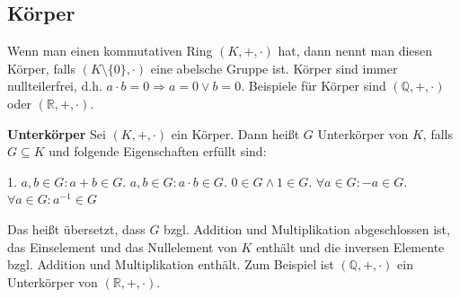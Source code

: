 \documentclass[12pt]{article}
\begin{document}
		\subsection{Körper}
			Wenn man einen kommutativen Ring $(K,+,\cdot)$ hat, dann nennt man diesen Körper, falls $(K\setminus\{0\},\cdot)$ eine abelsche Gruppe ist.\newline\newline
			Körper sind immer nullteilerfrei, d.h. $a\cdot b=0\Rightarrow a=0\lor b=0$.\newline\newline
			Beispiele für Körper sind $(\mathbb{Q},+,\cdot)$ oder $(\mathbb{R},+,\cdot)$.
			\begin{tcolorbox}[boxsep=0pt,top=0.75cm,left=.75cm,right=.5cm, bottom=.25cm,arc=0pt,auto outer arc,colback=white,colframe=black, enlarge top by=0.25cm]
				\textbf{Unterkörper}\vspace{.5em}\newline
				Sei $(K,+,\cdot)$ ein Körper. Dann heißt $G$ Unterkörper von $K$, falls $G\subseteq K$ und folgende Eigenschaften erfüllt sind:
				\begin{multicols}{2}
					1. $a,b\in G:a+b\in G$\newline{}. $a,b\in G:a\cdot b\in G$\newline{}. $0\in G\land 1\in G$\newline{}. $\forall a\in G:-a\in G$\newline{}. $\forall a\in G:a^{-1}\in G$\newline\newline
				\end{multicols}
			\end{tcolorbox}
			\noindent Das heißt übersetzt, dass $G$ bzgl. Addition und Multiplikation abgeschlossen ist, das Einselement und das Nullelement von $K$ enthält und die inversen Elemente bzgl. Addition und Multiplikation enthält. Zum Beispiel ist $(\mathbb{Q},+,\cdot)$ ein Unterkörper von $(\mathbb{R},+,\cdot)$.
\end{document}
